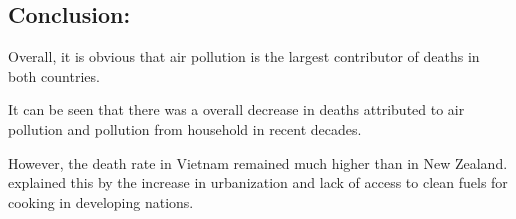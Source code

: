 \documentclass[11pt,a4paper,]{article}
\begin{document}
\hypertarget{conclusion-1}{%
\subsection{Conclusion:}\label{conclusion-1}}

Overall, it is obvious that air pollution is the largest contributor of deaths in both countries.

It can be seen that there was a overall decrease in deaths attributed to air pollution and pollution from household in recent decades.

However, the death rate in Vietnam remained much higher than in New Zealand. \textcite{gordon2014respiratory} explained this by the increase in urbanization and lack of access to clean fuels for cooking in developing nations.

\printbibliography
\end{document}

